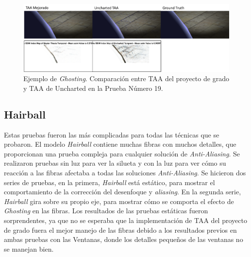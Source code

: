 \documentclass[pregrado]{tesis-usb} %
\begin{document}
\begin{figure}[!htb]
	\centering
	\includegraphics[scale=0.5]{images/results/sphere_ghosting.png}
	\caption{Ejemplo de \textit{Ghosting}. Comparación  entre TAA del proyecto de grado y TAA de Uncharted en la Prueba Número 19.}\label{fig:sphere_ghosting}
\end{figure}

\FloatBarrier

\subsection{Hairball}
Estas pruebas fueron las más complicadas para todas las técnicas que se probaron. El modelo \textit{Hairball} contiene muchas fibras con muchos detalles, que proporcionan una prueba compleja para cualquier solución de \textit{Anti-Aliasing}. Se realizaron pruebas sin luz para ver la silueta y con la luz para ver cómo su reacción a las fibras afectaba a todas las soluciones \textit{Anti-Aliasing}. Se hicieron dos series de pruebas, en la primera, \textit{Hairball} está estático, para mostrar el comportamiento de la corrección del desenfoque y \textit{aliasing}. En la segunda serie, \textit{Hairball} gira sobre su propio eje, para mostrar cómo se comporta el efecto de \textit{Ghosting} en las fibras. Los resultados de las pruebas estáticas fueron sorprendentes, ya que no se esperaba que la implementación de TAA del proyecto de grado fuera el mejor manejo de las fibras debido a los resultados previos en ambas pruebas con las Ventanas, donde los detalles pequeños de las ventanas no se manejan bien.
\end{document}

